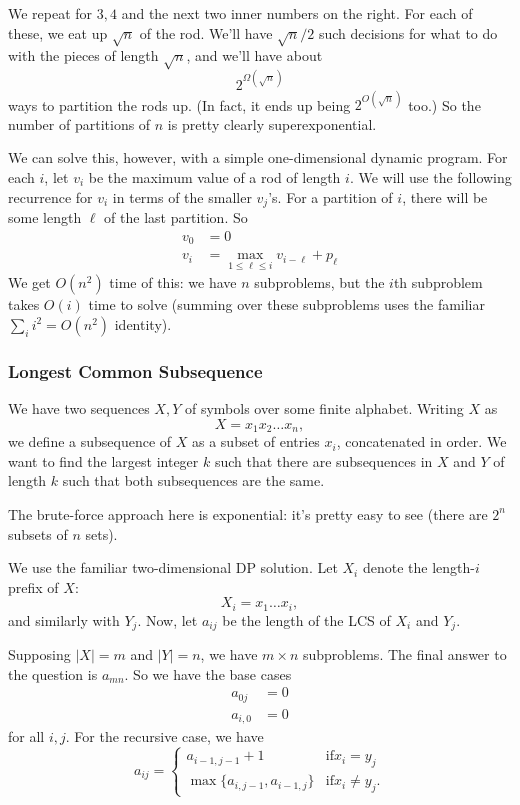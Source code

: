 \documentclass{article}
\begin{document}
We repeat for $3,4$ and the next two inner numbers on the right.
For each of these, we eat up $\sqrt n$ of the rod.
We'll have $\sqrt n / 2$ such decisions for what to do with the
pieces of length $\sqrt n$, and we'll have about
$$
2^{\Omega(\sqrt n)}
$$
ways to partition the rods up.
(In fact, it ends up being $2^{O(\sqrt n)}$ too.)
So the number of partitions of $n$ is pretty clearly superexponential.

We can solve this, however, with a simple one-dimensional dynamic program.
For each $i$, let $v_i$ be the maximum value of a rod of
length $i$.
We will use the following recurrence for $v_i$ in terms of the smaller $v_j$'s.
For a partition of $i$, there will be some length $\ell$ of the last
partition.
So
\begin{align*}
v_0 &= 0 \\
v_i &=
\max_{1\leq \ell \leq i}
v_{i-\ell} + p_\ell
\end{align*}
We get $O(n^2)$ time of this: we have $n$ subproblems, but the $i$th
subproblem takes $O(i)$ time to solve (summing over these subproblems
uses the familiar $\sum_i i^2 = O(n^2)$ identity).


\subsubsection{Longest Common Subsequence}

We have two sequences $X,Y$ of symbols over some finite alphabet.
Writing $X$ as
$$
X = x_1 x_2 \dots x_n,
$$
we define a subsequence of $X$ as a subset of entries $x_i$, concatenated
in order.
We want to find the largest integer $k$ such that there are
subsequences in $X$ and $Y$ of length $k$ such that both subsequences are
the same.

The brute-force approach here is exponential: it's pretty easy to see (there are $2^n$ subsets of $n$ sets).

We use the familiar two-dimensional DP solution.
Let $X_i$ denote the length-$i$ prefix of $X$:
$$
X_i = x_1\dots x_i,
$$
and similarly with $Y_j$.
Now, let
$a_{ij}$ be the length of the LCS of $X_i$ and $Y_j$.

Supposing $|X| = m$ and $|Y| = n$, we have $m\times n$ subproblems.
The final answer to the question is $a_{mn}$.
So we have the base cases
\begin{align*}
a_{0j} &= 0 \\
a_{i,0} &= 0
\end{align*}
for all $i,j$.
For the recursive case, we have
\begin{equation}
a_{ij} =
\left\{
	\begin{array}{ll}
		a_{i-1,j-1} + 1 & \mathrm{if } x_i = y_j \\
		\max\{a_{i,j-1}, a_{i-1,j}\} & \mathrm{if } x_i \neq y_j.
	\end{array}
\right.
\end{equation}
\end{document}

